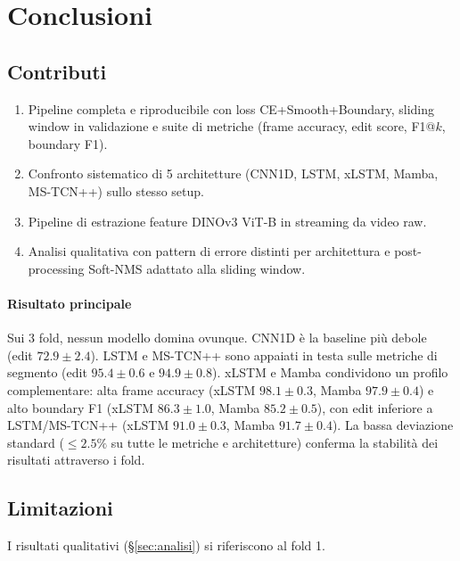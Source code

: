\documentclass[12pt, a4paper]{article}
\begin{document}
\section{Conclusioni}
\label{sec:conclusioni}

\subsection{Contributi}
\begin{enumerate}
  \item Pipeline completa e riproducibile con loss CE+Smooth+Boundary,
        sliding window in validazione e suite di metriche
        (frame accuracy, edit score, F1@$k$, boundary F1).
  \item Confronto sistematico di 5 architetture (CNN1D, LSTM, xLSTM, Mamba, MS-TCN++)
        sullo stesso setup.
  \item Pipeline di estrazione feature DINOv3 ViT-B in streaming da video raw.
  \item Analisi qualitativa con pattern di errore distinti per architettura
        e post-processing Soft-NMS adattato alla sliding window.
\end{enumerate}

\paragraph{Risultato principale}
Sui 3 fold, nessun modello domina ovunque. CNN1D \`e la baseline pi\`u debole
(edit $72.9 \pm 2.4$). LSTM e MS-TCN++ sono appaiati in testa sulle metriche
di segmento (edit $95.4 \pm 0.6$ e $94.9 \pm 0.8$). xLSTM e Mamba condividono
un profilo complementare: alta frame accuracy (xLSTM $98.1 \pm 0.3$, Mamba
$97.9 \pm 0.4$) e alto boundary F1 (xLSTM $86.3 \pm 1.0$, Mamba
$85.2 \pm 0.5$), con edit inferiore a LSTM/MS-TCN++ (xLSTM $91.0 \pm 0.3$,
Mamba $91.7 \pm 0.4$). La bassa deviazione standard ($\leq 2.5\%$ su tutte le
metriche e architetture) conferma la stabilit\`a dei risultati attraverso i fold.

\subsection{Limitazioni}
\label{sec:limitazioni}
I risultati qualitativi (\S\ref{sec:analisi}) si riferiscono al fold 1.
\end{document}
